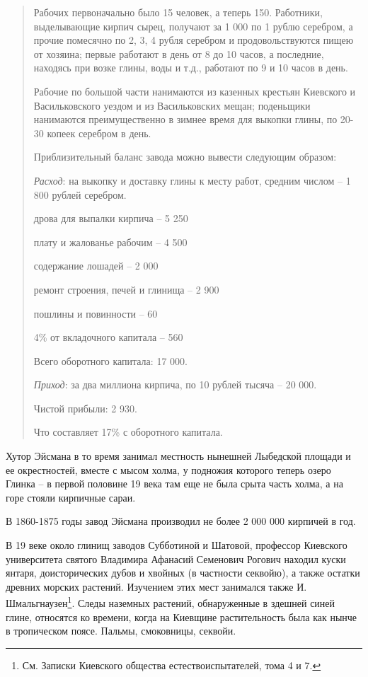 \begin{quotation}
Рабочих первоначально было 15 человек, а теперь 150. Работники, выделывающие кирпич сырец, получают за 1 000 по 1 рублю серебром, а прочие помесячно по 2, 3, 4 рубля серебром и продовольствуются пищею от хозяина; первые работают в день от 8 до 10 часов, а последние, находясь при возке глины, воды и т.д., работают по 9 и 10 часов в день. 

Рабочие по большой части нанимаются из казенных крестьян Киевского и Васильковского уездом и из Васильковских мещан; поденьщики нанимаются преимущественно в зимнее время для выкопки глины, по 20-30 копеек серебром в день.

Приблизительный баланс завода можно вывести следующим образом:

\textit{Расход}: на выкопку и доставку глины к месту работ, средним числом – 1 800 рублей серебром.

дрова для выпалки кирпича – 5 250

плату и жалованье рабочим – 4 500 

содержание лошадей – 2 000

ремонт строения, печей и глинища – 2 900

пошлины и повинности – 60

4\% от вкладочного капитала – 560

Всего оборотного капитала: 17 000. 

\textit{Приход}: за два миллиона кирпича, по 10 рублей тысяча – 20 000.

Чистой прибыли: 2 930. 

Что составляет 17\% с оборотного капитала.
\end{quotation}

Хутор Эйсмана в то время занимал местность нынешней Лыбедской площади и ее окрестностей, вместе с мысом холма, у подножия которого теперь озеро Глинка – в первой половине 19 века там еще не была срыта часть холма, а на горе стояли кирпичные сараи.

В 1860-1875 годы завод Эйсмана производил не более 2 000 000 кирпичей в год.

В 19 веке около глинищ заводов Субботиной и Шатовой, профессор Киевского университета святого Владимира Афанасий Семенович Рогович находил куски янтаря, доисторических дубов и хвойных (в частности секвойю), а также остатки древних морских растений. Изучением этих мест занимался также И. Шмальгнаузен\footnote{См. Записки Киевского общества естествоиспытателей, тома 4 и 7.}. Следы наземных растений, обнаруженные в здешней синей глине, относятся ко времени, когда на Киевщине растительность была как нынче в тропическом поясе. Пальмы, смоковницы, секвойи.


